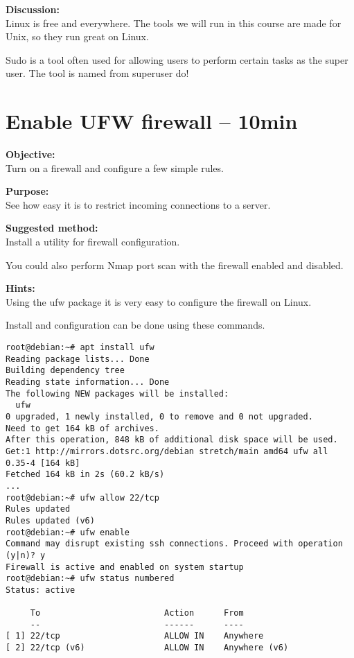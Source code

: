 \documentclass[a4paper,11pt,notitlepage]{report}
\begin{document}
{\bf Discussion:}\\
Linux is free and everywhere. The tools we will run in this course are made for Unix, so they run great on Linux.

Sudo is a tool often used for allowing users to perform certain tasks as the super user. The tool is named from superuser do! 


\chapter{Enable UFW firewall -- 10min}
\label{ex:debian-firewall}

{\bf Objective:}\\
Turn on a firewall and configure a few simple rules.

{\bf Purpose:}\\
See how easy it is to restrict incoming connections to a server.


{\bf Suggested method:}\\
Install a utility for firewall configuration.

You could also perform Nmap port scan with the firewall enabled and disabled.

{\bf Hints:}\\
Using the ufw package it is very easy to configure the firewall on Linux.

Install and configuration can be done using these commands.
\begin{verbatim}
root@debian:~# apt install ufw
Reading package lists... Done
Building dependency tree
Reading state information... Done
The following NEW packages will be installed:
  ufw
0 upgraded, 1 newly installed, 0 to remove and 0 not upgraded.
Need to get 164 kB of archives.
After this operation, 848 kB of additional disk space will be used.
Get:1 http://mirrors.dotsrc.org/debian stretch/main amd64 ufw all 0.35-4 [164 kB]
Fetched 164 kB in 2s (60.2 kB/s)
...
root@debian:~# ufw allow 22/tcp
Rules updated
Rules updated (v6)
root@debian:~# ufw enable
Command may disrupt existing ssh connections. Proceed with operation (y|n)? y
Firewall is active and enabled on system startup
root@debian:~# ufw status numbered
Status: active

     To                         Action      From
     --                         ------      ----
[ 1] 22/tcp                     ALLOW IN    Anywhere
[ 2] 22/tcp (v6)                ALLOW IN    Anywhere (v6)
\end{verbatim}
\end{document}
